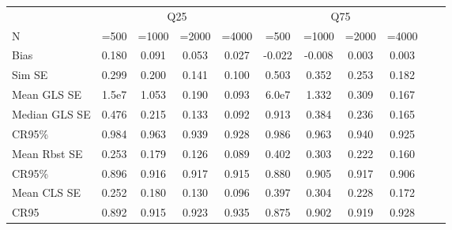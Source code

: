 
\begin{tabular}[hbt!]{l*{10}{c}}
    \hline 
             &      \multicolumn{4}{c}{Q25}   &      \multicolumn{4}{c}{Q75}   &\\
             N        &  =500& =1000 & =2000     &    =4000 &  =500& =1000 & =2000     &   =4000 & \\
   \hline
    Bias    &       0.180&       0.091&       0.053&       0.027&      -0.022&      -0.008&       0.003&       0.003\\
    Sim SE         &       0.299&       0.200&       0.141&       0.100&       0.503&       0.352&       0.253&       0.182\\
    Mean GLS SE      &1.5e7&       1.053&       0.190&       0.093&6.0e7 &       1.332&       0.309&       0.167\\
    Median GLS SE      &       0.476&       0.215&       0.133&       0.092&       0.913&       0.384&       0.236&       0.165\\
    CR95\%      &       0.984&       0.963&       0.939&       0.928&       0.986&       0.963&       0.940&       0.925\\
    Mean Rbst SE    &       0.253&       0.179&       0.126&       0.089&       0.402&       0.303&       0.222&       0.160\\
    CR95\%       &       0.896&       0.916&       0.917&       0.915&       0.880&       0.905&       0.917&       0.906\\
    Mean CLS SE    &       0.252&       0.180&       0.130&       0.096&       0.397&       0.304&       0.228&       0.172\\
    CR95\       &       0.892&       0.915&       0.923&       0.935&       0.875&       0.902&       0.919&       0.928\\
    \hline 
\end{tabular}

 